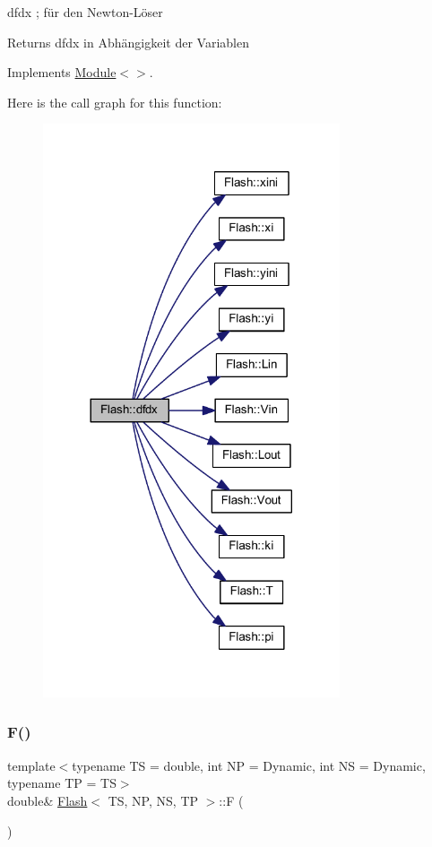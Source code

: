 dfdx ; für den Newton-\/\+Löser 

\begin{DoxyReturn}{Returns}
dfdx in Abhängigkeit der Variablen 
\end{DoxyReturn}


Implements \mbox{\hyperlink{class_module_a0762d7cbad2a73d5eff3f2f1155e8e33}{Module$<$$>$}}.

Here is the call graph for this function\+:\nopagebreak
\begin{figure}[H]
\begin{center}
\leavevmode
\includegraphics[width=248pt]{class_flash_a83e35b3ab13b3705f0fe06c40b800a8b_cgraph}
\end{center}
\end{figure}
\mbox{\label{class_flash_ac44eff7052e26a0075c21b4f068e162e}} 
\subsubsection{\texorpdfstring{F()}{F()}}
{\footnotesize\ttfamily template$<$typename TS = double, int NP = Dynamic, int NS = Dynamic, typename TP = TS$>$ \\
double\& \mbox{\hyperlink{class_flash}{Flash}}$<$ TS, NP, NS, TP $>$\+::F (\begin{DoxyParamCaption}{ }\end{DoxyParamCaption})\hspace{0.3cm}{\ttfamily [inline]}}



